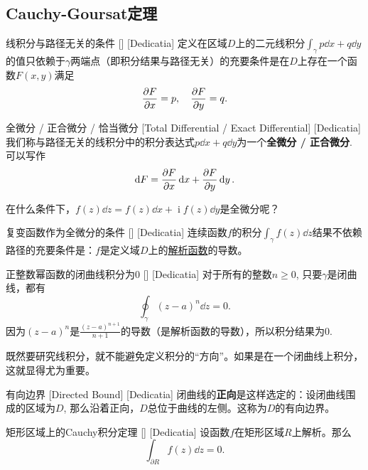 \documentclass[UTF8]{ctexart}
\DeclareMathOperator{\ii}{\mathrm{i}}
\newcommand{\AnalyticalFunction}{\hyperref[dfn:AnalyticalFunction]{解析函数}}
\begin{document}
\subsection{Cauchy-Goursat定理}
\begin{thm}
    [UUID]
    {线积分与路径无关的条件}
    []
    [Dedicatia]
    定义在区域$D$上的二元线积分$\int_\gamma p\dd{x}+q\dd{y}$的值只依赖于$\gamma$两端点（即积分结果与路径无关）的充要条件是在$D$上存在一个函数$F(x,y)$满足
    \[\pdv{F}{x}=p,\quad\pdv{F}{y}=q.\]
\end{thm}
\begin{dfn}
    [UUID]
    {全微分 / 正合微分 / 恰当微分\label{dfn:ExactDifferential}}
    [Total Differential / Exact Differential]
    [Dedicatia]
    我们称与路径无关的线积分中的积分表达式$p\dd{x}+q\dd{y}$为一个\textbf{全微分 / 正合微分}. 可以写作
    \[\dd{F}=\pdv{F}{x}\dd{x}+\pdv{F}{y}\dd{y}.\]
\end{dfn}
在什么条件下，$f(z)\dd{z}=f(z)\dd{x}+\ii f(z)\dd{y}$是全微分呢？
\begin{crl}
    [UUID]
    {复变函数作为全微分的条件}
    []
    [Dedicatia]
    连续函数$f$的积分$\int_\gamma f(z)\dd{z}$结果不依赖路径的充要条件是：$f$是定义域$D$上的\AnalyticalFunction 的导数。
\end{crl}
\begin{xmp}
    [UUID]
    {正整数幂函数的闭曲线积分为0}
    []
    [Dedicatia]
    对于所有的整数$n\geqslant 0$, 只要$\gamma$是闭曲线，都有
    \[\oint_\gamma (z-a)^n\dd{z}=0.\]
    因为$(z-a)^n$是$\frac{(z-a)^{n+1}}{n+1}$的导数（是解析函数的导数），所以积分结果为0. 
\end{xmp}
既然要研究线积分，就不能避免定义积分的“方向”。如果是在一个闭曲线上积分，这就显得尤为重要。
\begin{dfn}
    [UUID]
    {有向边界}
    [Directed Bound]
    [Dedicatia]
    闭曲线的\textbf{正向}是这样选定的：设闭曲线围成的区域为$D$, 那么沿着正向，$D$总位于曲线的左侧。这称为$D$的有向边界。
\end{dfn}
\begin{thm}
    [UUID]
    {矩形区域上的Cauchy积分定理}
    []
    [Dedicatia]
    设函数$f$在矩形区域$R$上解析。那么
    \[\int_{\partial R}f(z)\dd{z}=0.\]
\end{thm}
\end{document}
